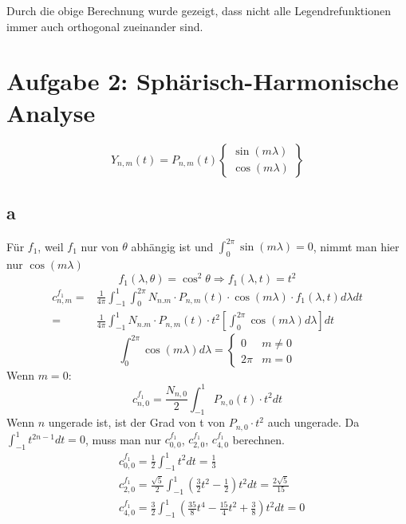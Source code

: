 Durch die obige Berechnung wurde gezeigt, dass nicht alle Legendrefunktionen immer auch orthogonal zueinander sind. 


\clearpage
\section{Aufgabe 2: Sphärisch-Harmonische Analyse}
\begin{equation}
	Y_{n,m}(t) = P_{n,m}(t) \begin{Bmatrix}
	\sin(m\lambda) \\
	\cos(m \lambda)
	\end{Bmatrix}
\end{equation}
\subsection{a}
Für $f_1$, weil $f_1$ nur von $\theta$ abhängig ist und $\int_{0}^{2\pi}\sin(m\lambda) = 0$, nimmt man hier nur $\cos(m\lambda)$
\begin{equation}
	f_1(\lambda,\theta) = \cos^2\theta \Longrightarrow f_1(\lambda,t) = t^2 
\end{equation}
\begin{align}
	c_{n,m}^{f_1} = & \frac{1}{4\pi} \int_{-1}^{1} \int_{0}^{2\pi} N_{n.m} \cdot P_{n,m}(t) \cdot \cos(m\lambda) \cdot f_1(\lambda,t) d\lambda dt \\
	= & \frac{1}{4\pi} \int_{-1}^{1} N_{n.m} \cdot P_{n,m}(t) \cdot t^2  \left[\int_{0}^{2\pi} \cos(m\lambda) d\lambda\right]  dt
\end{align}
\begin{equation}
	\int_{0}^{2\pi} \cos(m\lambda) d\lambda = \begin{cases}
	0 & m \neq 0 \\
	2\pi & m=0
	\end{cases}
\end{equation}
Wenn $m=0$:
\begin{equation}
	c_{n,0}^{f_1} = \frac{N_{n,0}}{2} \int_{-1}^{1} P_{n,0}(t) \cdot t^2 dt
\end{equation}
Wenn $n$ ungerade ist, ist der Grad von t von $P_{n,0}\cdot t^2$ auch ungerade. Da $\int_{-1}^{1} t^{2n-1}dt = 0$, muss man nur $c_{0,0}^{f_1}$, $c_{2,0}^{f_1}$, $c_{4,0}^{f_1}$ berechnen.
\begin{align}
	& c_{0,0}^{f_1} = \frac{1}{2} \int_{-1}^{1} t^2 dt = \frac{1}{3} \\
	& c_{2,0}^{f_1} = \frac{\sqrt{5}}{2} \int_{-1}^{1} \left(\frac{3}{2}t^2-\frac{1}{2}\right)t^2dt = \frac{2\sqrt{5}}{15} \\
	& c_{4,0}^{f_1} = \frac{3}{2} \int_{-1}^{1} \left(\frac{35}{8}t^4 - \frac{15}{4}t^2 + \frac{3}{8}\right)t^2dt = 0
\end{align}
